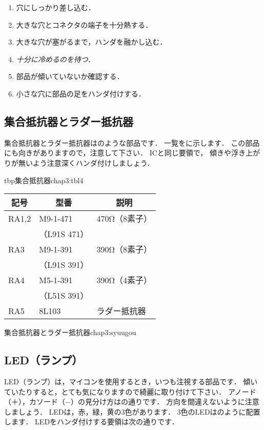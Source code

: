 
\begin{enumerate}
\item 穴にしっかり差し込む．
\item 大きな穴とコネクタの端子を十分熱する．
\item 大きな穴が塞がるまで，ハンダを融かし込む．
\item \emph{十分に冷めるのを待つ．}
\item 部品が傾いていないか確認する．
\item 小さな穴に部品の足をハンダ付けする．
\end{enumerate}

\subsection{集合抵抗器とラダー抵抗器}
集合抵抗器とラダー抵抗器はのような部品です．
一覧をに示します．
この部品にも向きがありますので，注意して下さい．
ICと同じ要領で，
傾きや浮き上がりが無いよう注意深くハンダ付けしましょう．

\begin{mytable}{tbp}{集合抵抗器}{chap3:tbl4}
  {\small\begin{tabular}{l|l|l}
    \hline
    \hline
    \multicolumn{1}{c|}{記号} &
    \multicolumn{1}{c|}{型番} &
    \multicolumn{1}{c}{説明} \\
    \hline
    RA1,2 & M9-1-471   & 470Ω（8素子） \\
    &（L91S 471）&               \\
    RA3   & M9-1-391   & 390Ω（8素子） \\
    &（L91S 391）&               \\
    RA4   & M5-1-391   & 390Ω（4素子） \\
    &（L51S 391）&               \\
    RA5   & 8L103      & ラダー抵抗器  \\
  \end{tabular}}
\end{mytable}

          {集合抵抗器とラダー抵抗器}{chap3:syuugou}

\subsection{LED（ランプ）}
LED（ランプ）は，マイコンを使用するとき，いつも注視する部品です．
傾いていたりすると，とても気になりますので綺麗に取り付けて下さい．
アノード（＋），カソード（−）の見分け方はの通りです．
方向を間違えないように注意しましょう．
LEDは，赤，緑，黄の3色があります．
3色のLEDはのように配置します．
LEDをハンダ付けする要領は次の通りです．


